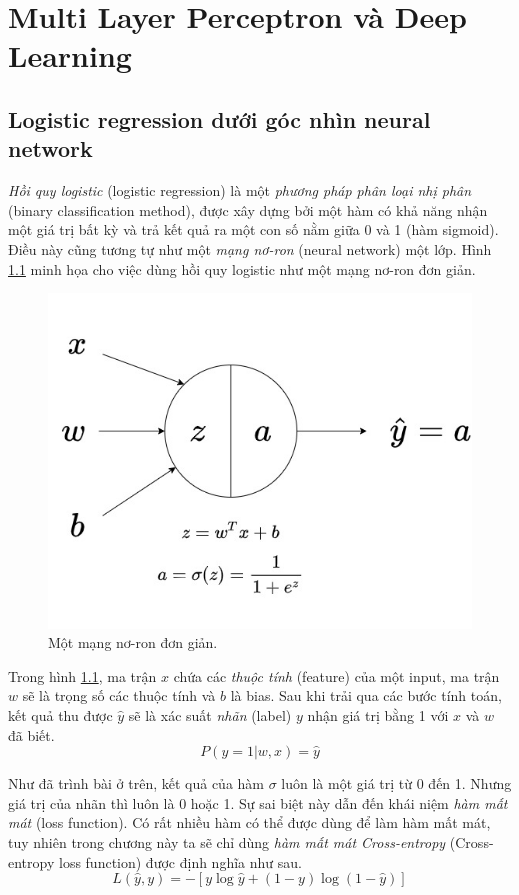 \chapter{Multi Layer Perceptron và Deep Learning}
\label{chp:03}

\section{Logistic regression dưới góc nhìn neural network}
\label{sec31}
\textit{Hồi quy logistic} (logistic regression) là một \textit{phương pháp phân loại nhị phân} (binary classification method), được xây dựng bởi một hàm có khả năng nhận một giá trị bất kỳ và trả kết quả ra một con số nằm giữa 0 và 1 (hàm sigmoid). Điều này cũng tương tự như một \textit{mạng nơ-ron} (neural network) một lớp. Hình \ref{fig:LogisticRegressionNN} minh họa cho việc dùng hồi quy logistic như một mạng nơ-ron đơn giản.

\begin{figure}[!h]
	\centering
		\includegraphics[width=0.5\columnwidth]{books/artificial-neural-network/chapter03/figure/LogisticRegressionNN.jpg}
        \caption{Một mạng nơ-ron đơn giản.}
        \label{fig:LogisticRegressionNN}
		\centering
\end{figure}

Trong hình \ref{fig:LogisticRegressionNN}, ma trận $x$ chứa các \textit{thuộc tính} (feature) của một input, ma trận $w$ sẽ là trọng số các thuộc tính và $b$ là bias. Sau khi trải qua các bước tính toán, kết quả thu được $\hat{y}$ sẽ là xác suất \textit{nhãn} (label) $y$ nhận giá trị bằng 1 với $x$ và $w$ đã biết.
\[ P(y=1|w,x) = \hat{y}\]

Như đã trình bài ở trên, kết quả của hàm $\sigma$ luôn là một giá trị từ 0 đến 1. Nhưng giá trị của nhãn thì luôn là 0 hoặc 1. Sự sai biệt này dẫn đến khái niệm \textit{hàm mất mát} (loss function). Có rất nhiều hàm có thể được dùng để làm hàm mất mát, tuy nhiên trong chương này ta sẽ chỉ dùng \textit{ hàm mất mát Cross-entropy} (Cross-entropy loss function) được định nghĩa như sau.
\[ L(\hat{y},y) = -  [y\log{\hat{y}} + (1-y)\log{(1-\hat{y})}] \]

